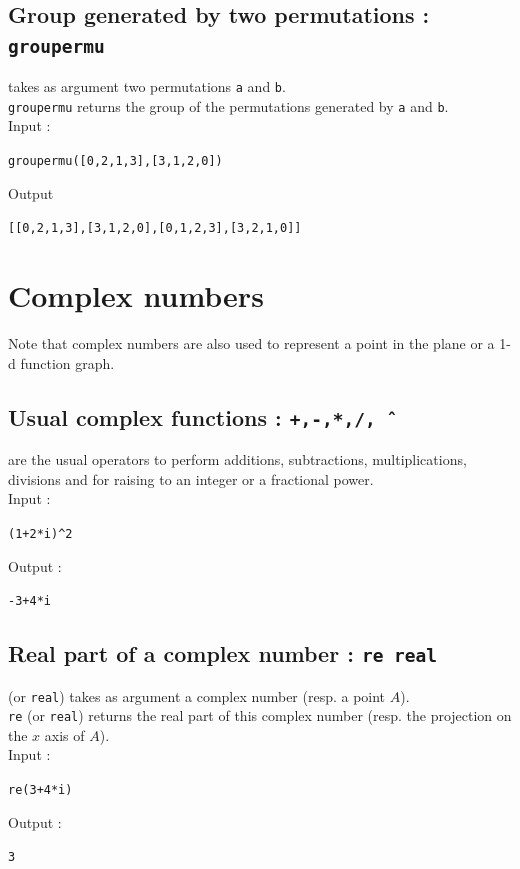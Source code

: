 \documentclass[a4paper,11pt]{book}
\begin{document}
\subsection{Group generated by two permutations : {\tt groupermu}}
 takes as argument two permutations {\tt a} and 
{\tt b}.\\
{\tt groupermu} returns the group of the permutations generated by {\tt a} and 
{\tt b}.\\
Input :
\begin{center}{\tt groupermu([0,2,1,3],[3,1,2,0])}\end{center}
Output
\begin{center}{\tt [[0,2,1,3],[3,1,2,0],[0,1,2,3],[3,2,1,0]]}\end{center}

\section{Complex numbers}
Note that complex numbers are also used to represent a point in the
plane or a 1-d function graph.

\subsection{Usual  complex functions : {\tt +,-,*,/,\^\ }}\index{+}\index{-}\index{\^\ }
\noindent {\tt +,-,*,/,\^\ } are the usual operators to perform
additions, subtractions, multiplications, divisions and for raising to an
integer or a fractional power.\\
Input :
\begin{center}{\tt (1+2*i)\verb|^|2}\end{center}
Output :
\begin{center}{\tt -3+4*i}\end{center}

\subsection{Real part of a complex number : {\tt re real}}
 (or {\tt real}) takes as argument a complex number (resp. a 
point $A$).\\
{\tt re} (or {\tt real}) returns the real part of this complex number (resp.
the projection on the $x$ axis of $A$).\\
Input :
\begin{center}{\tt re(3+4*i)}\end{center}
Output :
\begin{center}{\tt 3}\end{center}
\end{document}
